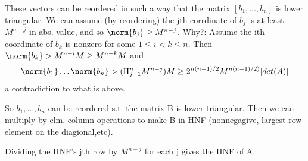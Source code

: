 These vectors can be reordered in such a way that the matrix $[b_1,\dots, b_n]$ is lower triangular. We can assume (by reordering) the jth corrdinate of $b_j$ is at least $M^{n-j}$ in abs. value, and so $\norm{b_j} \geq M^{n-j}$. Why?: Assume the ith coordinate of $b_{k}$ is nonzero for some $1 \leq i < k \leq n$. Then $\norm{b_k} > M^{n-i}M \geq M^{n-k}M$ and
\[ \norm{b_1}\dots\norm{b_n}  > (\Pi_{j=1}^n M^{n-j})M \geq 2^{n(n-1)/2}M^{n(n-1)/2)}|det(A)| \]
a contradiction to what is above.

So $b_1, \dots, b_n$ can be reordered s.t. the matrix B is lower triangular. Then we can multiply by elm. column operations to make B in HNF (nonnegagive, largest row element on the diagional,etc).

Dividing the HNF's jth row by $M^{n-j}$ for each j gives the HNF of A.
